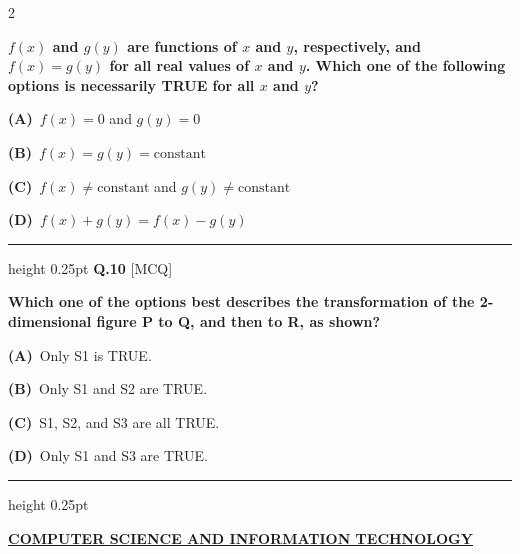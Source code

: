 \documentclass[a4paper,10pt,twoside]{article}
\begin{document}
\begin{multicols}{2}
\par\vspace{2pt}
{\bfseries $f(x)$ and $g(y)$ are functions of $x$ and $y$, respectively, and $f(x) = g(y)$ for all real values of $x$ and $y$. Which one of the following options is necessarily TRUE for all $x$ and $y$? \par}
\par\vspace{2pt}\noindent
\textbf{(A)}~$f(x) = 0$ and $g(y) = 0$\par\vspace{2pt}\noindent
\textbf{(B)}~$f(x) = g(y) = \text{constant}$\par\vspace{2pt}\noindent
\textbf{(C)}~$f(x) \neq \text{constant}$ and $g(y) \neq \text{constant}$\par\vspace{2pt}\noindent
\textbf{(D)}~$f(x) + g(y) = f(x) - g(y)$
\par\vspace{6pt}\hrule height 0.25pt\vspace{6pt}
\noindent\textbf{Q.10} \hfill {\footnotesize\textsf{[MCQ]}}
\par\vspace{2pt}
{\bfseries Which one of the options best describes the transformation of the 2-dimensional figure P to Q, and then to R, as shown? \par}
\par\vspace{2pt}\noindent
\textbf{(A)}~Only S1 is TRUE.\par\vspace{2pt}\noindent
\textbf{(B)}~Only S1 and S2 are TRUE.\par\vspace{2pt}\noindent
\textbf{(C)}~S1, S2, and S3 are all TRUE.\par\vspace{2pt}\noindent
\textbf{(D)}~Only S1 and S3 are TRUE.
\par\vspace{6pt}\hrule height 0.25pt\vspace{6pt}

\vspace{8pt}
\noindent\textbf{\large\underline{COMPUTER SCIENCE AND INFORMATION TECHNOLOGY}}\\[2pt]
\vspace{4pt}


\end{multicols}
\end{document}
